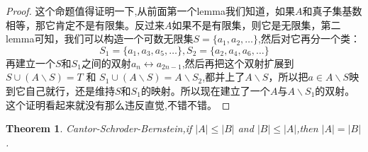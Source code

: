 \documentclass{article}
\newtheorem{theorem}{Theorem}[section]
\begin{document}
\begin{proof}
这个命题值得证明一下,从前面第一个lemma我们知道，如果$A$和真子集基数相等，那它肯定不是有限集。反过来$A$如果不是有限集，则它是无限集，第二lemma可知，我们可以构造一个可数无限集$S=\{a_1,a_2,\ldots\}$,然后对它再分一个类：\[S_1 = \{a_1, a_3, a_5, \ldots\}, S_2 = \{a_2, a_4, a_6, \ldots\}\]再建立一个$S$和$S_1$之间的双射$a_n \leftrightarrow a_{2n-1}$,然后再把这个双射扩展到$S \cup (A \smallsetminus S) = T$ 和 $S_1 \cup (A \smallsetminus S) = A \smallsetminus S_2$,都并上了$A \smallsetminus S$，所以把$a \in A \smallsetminus S$映到它自己就行，还是维持$S$和$S_1$的映射。所以现在建立了一个$A$与$A \smallsetminus S_1$的双射。这个证明看起来就没有那么违反直觉,不错不错。
\end{proof}

\begin{theorem}
Cantor-Schroder-Bernstein,if $|A|\leq|B|$ and $|B|\leq |A|$,then $|A|=|B|$.
\end{theorem}
\end{document}
